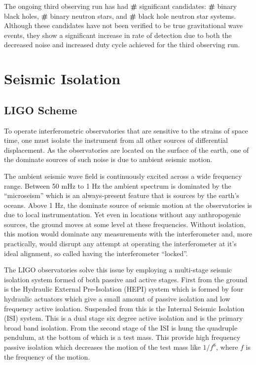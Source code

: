 \documentclass [12pt, proquest]{uwthesis}[2019]
\begin{document}
The ongoing third observing run has had \textbf{\#} significant candidates: \textbf{\#} binary black holes, \textbf{\#} binary neutron stars, and \textbf{\#} black hole neutron star systems. Although these candidates have not been verified to be true gravitational wave events, they show a significant increase in rate of detection due to both the decreased noise and increased duty cycle achieved for the third observing run.

\section{Seismic Isolation}

\subsection{LIGO Scheme}

To operate interferometric observatories that are sensitive to the strains of space time, one must isolate the instrument from all other sources of differential displacement. As the observatories are located on the surface of the earth, one of the dominate sources of such noise is due to ambient seismic motion. 

The ambient seismic wave field is continuously excited across a wide frequency range. Between 50 mHz to 1 Hz the ambient spectrum is dominated by the ``microseism'' which is an always-present feature that is sources by the earth's oceans. Above 1 Hz, the dominate source of seismic motion at the observatories is due to local instrumentation. Yet even in locations without any anthropogenic sources, the ground moves at some level at these frequencies. Without isolation, this motion would dominate any measurements with the interferometer and, more practically, would disrupt any attempt at operating the interferometer at it's ideal alignment, so called having the interferometer ``locked''.

The LIGO observatories solve this issue by employing a multi-stage seismic isolation system formed of both passive and active stages. First from the ground is the Hydraulic External Pre-Isolation (HEPI) system which is formed by four hydraulic actuators which give a small amount of passive isolation and low frequency active isolation. Suspended from this is the Internal Seismic Isolation (ISI) system. This is a dual stage six degree active isolation and is the primary broad band isolation. From the second stage of the ISI is hung the quadruple pendulum, at the bottom of which is a test mass. This provide high frequency passive isolation which decreases the motion of the test mass like $1/f^8$, where $f$ is the frequency of the motion.
\end{document}
